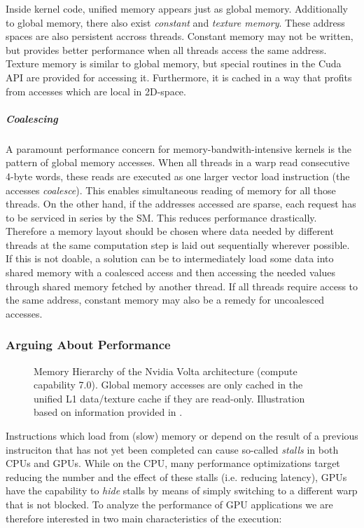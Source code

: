 Inside kernel code, unified memory appears just as global memory. Additionally to global memory, there also exist \emph{constant} and \emph{texture memory}. These address spaces are also persistent accross threads. Constant memory may not be written, but provides better performance when all threads access the same address. Texture memory is similar to global memory, but special routines in the Cuda API are provided for accessing it. Furthermore, it is cached in a way that profits from accesses which are local in 2D-space.

\subparagraph{Coalescing}

A paramount performance concern for memory-bandwith-intensive kernels is the pattern of global memory accesses. When all threads in a warp read consecutive 4-byte words, these reads are executed as one larger vector load instruction (the accesses \emph{coalesce}). This enables simultaneous reading of memory for all those threads. On the other hand, if the addresses accessed are sparse, each request has to be serviced in series by the SM. This reduces performance drastically. Therefore a memory layout should be chosen where data needed by different threads at the same computation step is laid out sequentially wherever possible. If this is not doable, a solution can be to intermediately load some data into shared memory with a coalesced access and then accessing the needed values through shared memory fetched by another thread. If all threads require access to the same address, constant memory may also be a remedy for uncoalesced accesses.

\subsubsection{Arguing About Performance}

\begin{figure}
	\makebox[\textwidth]{
	}
	\caption{\label{fig:memory-hierarchy} Memory Hierarchy of the Nvidia Volta architecture (compute capability 7.0). Global memory accesses are only cached in the unified L1 data/texture cache if they are read-only. Illustration based on information provided in \cite[Sections 2.3, 5.3.2, H.6]{cuda-programming}.}
\end{figure}

Instructions which load from (slow) memory or depend on the result of a previous instruciton that has not yet been completed can cause so-called \emph{stalls} in both CPUs and GPUs. While on the CPU, many performance optimizations target reducing the number and the effect of these stalls (i.e. reducing latency), GPUs have the capability to \emph{hide} stalls by means of simply switching to a different warp that is not blocked. To analyze the performance of GPU applications we are therefore interested in two main characteristics of the execution:

